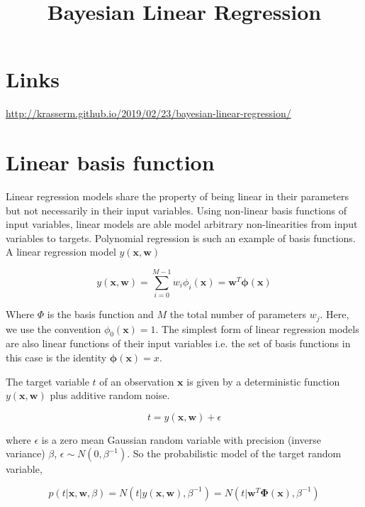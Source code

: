 \documentclass[a4paper,10pt]{article}
\title{Bayesian Linear Regression}
\author{}
\begin{document}
\maketitle

\begin{abstract}

\end{abstract}

\section{Links}

\url{http://krasserm.github.io/2019/02/23/bayesian-linear-regression/}

\section{Linear basis function }

Linear regression models share the property of being linear in their parameters but not necessarily in their input variables.
Using non-linear basis functions of input variables, linear models are able model arbitrary non-linearities from input variables to targets.  
Polynomial regression is such an example of basis functions.
A linear regression model $y(\bm{x},\bm{w})$

\begin{equation}
y(\bm{x},\bm{w}) = \sum_{i=0}^{M-1} w_i \phi_i(\bm{x}) = \bm{w}^T \bm{\phi}(\bm{x})
\end{equation}

Where $\Phi$ is the basis function and $M$ the total number of parameters $w_j$.
Here, we use the convention $\phi_0(\bm{x})=1$.
The simplest form of linear regression models are also linear functions of their input variables i.e. the set of basis functions in this case is the identity $\bm{\phi}(\bm{x})=x$. 

The target variable $t$ of an observation $\bm{x}$ is given by a deterministic function $y(\bm{x},\bm{w})$ plus additive random noise.

\begin{equation}
 t = y(\bm{x},\bm{w}) + \epsilon
\end{equation}

where $\epsilon$ is a zero mean Gaussian random variable with precision (inverse variance) $\beta$, $\epsilon \sim N(0,\beta^{-1})$.
So the probabilistic model of the target random variable,

\begin{equation}
p(t | \bm{x}, \bm{w}, \beta) = N(t | y(\bm{x},\bm{w}), \beta^{-1}) = N(t | \bm{w}^T \bm{\Phi}(\bm{x}) , \beta^{-1})
\end{equation}
\end{document}
